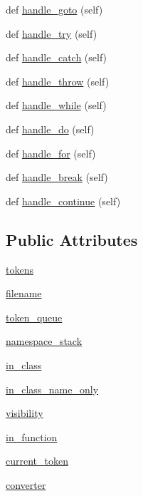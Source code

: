 \begin{DoxyCompactItemize}
def \mbox{\hyperlink{classcpp_1_1ast_1_1_ast_builder_a8504d788bb1541ee581918d52d1f4132}{handle\+\_\+goto}} (self)
\item 
def \mbox{\hyperlink{classcpp_1_1ast_1_1_ast_builder_a6c7998f3fdcd046718ff809dbe257645}{handle\+\_\+try}} (self)
\item 
def \mbox{\hyperlink{classcpp_1_1ast_1_1_ast_builder_aa38687383d0f54d26416054cf2141837}{handle\+\_\+catch}} (self)
\item 
def \mbox{\hyperlink{classcpp_1_1ast_1_1_ast_builder_ad4a308ded4a1f87e686b9e11fec31be9}{handle\+\_\+throw}} (self)
\item 
def \mbox{\hyperlink{classcpp_1_1ast_1_1_ast_builder_aac812e812ba2e5fbd80dde93be01a414}{handle\+\_\+while}} (self)
\item 
def \mbox{\hyperlink{classcpp_1_1ast_1_1_ast_builder_a540226b483513b423d4ec2c4f10b18f5}{handle\+\_\+do}} (self)
\item 
def \mbox{\hyperlink{classcpp_1_1ast_1_1_ast_builder_a0025c4d8ca779d69552e0947665eb1c4}{handle\+\_\+for}} (self)
\item 
def \mbox{\hyperlink{classcpp_1_1ast_1_1_ast_builder_a2b663a3e15e70b9d85bf17afb2bcf07a}{handle\+\_\+break}} (self)
\item 
def \mbox{\hyperlink{classcpp_1_1ast_1_1_ast_builder_a511eb003ed301a713a687e5293584077}{handle\+\_\+continue}} (self)
\end{DoxyCompactItemize}
\subsection*{Public Attributes}
\begin{DoxyCompactItemize}
\item 
\mbox{\hyperlink{classcpp_1_1ast_1_1_ast_builder_a1b21f8bef712e91862ccb6b1147cab0d}{tokens}}
\item 
\mbox{\hyperlink{classcpp_1_1ast_1_1_ast_builder_ad8b8f5788de55d6c7151e82af8b21115}{filename}}
\item 
\mbox{\hyperlink{classcpp_1_1ast_1_1_ast_builder_ae167f12797e7c02c1b60c11c83cdb22f}{token\+\_\+queue}}
\item 
\mbox{\hyperlink{classcpp_1_1ast_1_1_ast_builder_ab183aa48e4b6e116379f95eb3d11039c}{namespace\+\_\+stack}}
\item 
\mbox{\hyperlink{classcpp_1_1ast_1_1_ast_builder_a9edc1e10a3f005b463fd9316d83dd15d}{in\+\_\+class}}
\item 
\mbox{\hyperlink{classcpp_1_1ast_1_1_ast_builder_a376583354ab9afa308b7f34105bf3f4a}{in\+\_\+class\+\_\+name\+\_\+only}}
\item 
\mbox{\hyperlink{classcpp_1_1ast_1_1_ast_builder_a2f16b19846c405101235432d2666b614}{visibility}}
\item 
\mbox{\hyperlink{classcpp_1_1ast_1_1_ast_builder_ad5ac0612dfff44241033864832dbdfe3}{in\+\_\+function}}
\item 
\mbox{\hyperlink{classcpp_1_1ast_1_1_ast_builder_a38579523ccc1ae9d202ac722baea45fc}{current\+\_\+token}}
\item 
\mbox{\hyperlink{classcpp_1_1ast_1_1_ast_builder_ae8551cf0405bc6e367636b1f3b37d083}{converter}}
\end{DoxyCompactItemize}
